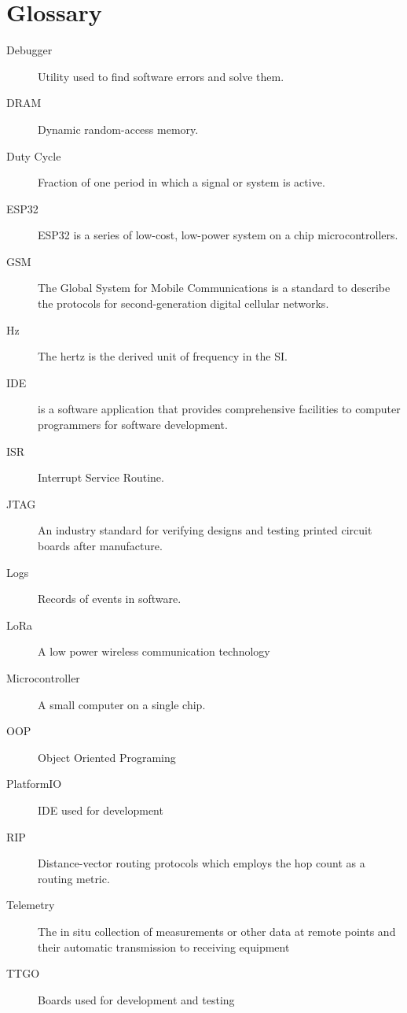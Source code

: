 \section*{Glossary}

\begin{description}
	\item[Debugger] Utility used to find software errors and solve them.
	\item[DRAM] Dynamic random-access memory.
	\item[Duty Cycle] Fraction of one period in which a signal or system is active. 
	\item[ESP32] ESP32 is a series of low-cost, low-power system on a chip microcontrollers.
	\item[GSM] The Global System for Mobile Communications is a standard to describe the protocols for second-generation digital cellular networks.
	\item[Hz] The hertz is the derived unit of frequency in the SI.
	\item[IDE] is a software application that provides comprehensive facilities to computer programmers for software development.
	\item[ISR] Interrupt Service Routine.
	\item[JTAG] An industry standard for verifying designs and testing printed circuit boards after manufacture. 
	\item[Logs] Records of events in software.
	\item[LoRa] A low power wireless communication technology
	\item[Microcontroller] A small computer on a single chip.
	\item[OOP] Object Oriented Programing
	\item[PlatformIO] IDE used for development
	\item[RIP] Distance-vector routing protocols which employs the hop count as a routing metric.
	\item[Telemetry] The in situ collection of measurements or other data at remote points and their automatic transmission to receiving equipment
	\item[TTGO] Boards used for development and testing
\end{description}